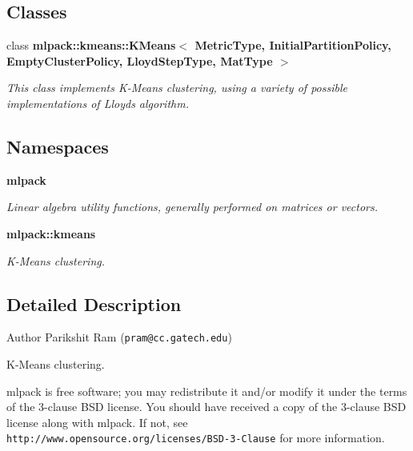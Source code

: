 \subsection*{Classes}
\begin{DoxyCompactItemize}
\item 
class {\bf mlpack\+::kmeans\+::\+K\+Means$<$ Metric\+Type, Initial\+Partition\+Policy, Empty\+Cluster\+Policy, Lloyd\+Step\+Type, Mat\+Type $>$}
\begin{DoxyCompactList}\small\item\em This class implements K-\/\+Means clustering, using a variety of possible implementations of Lloyd\textquotesingle{}s algorithm. \end{DoxyCompactList}\end{DoxyCompactItemize}
\subsection*{Namespaces}
\begin{DoxyCompactItemize}
\item 
 {\bf mlpack}
\begin{DoxyCompactList}\small\item\em Linear algebra utility functions, generally performed on matrices or vectors. \end{DoxyCompactList}\item 
 {\bf mlpack\+::kmeans}
\begin{DoxyCompactList}\small\item\em K-\/\+Means clustering. \end{DoxyCompactList}\end{DoxyCompactItemize}


\subsection{Detailed Description}
\begin{DoxyAuthor}{Author}
Parikshit Ram ({\tt pram@cc.\+gatech.\+edu})
\end{DoxyAuthor}
K-\/\+Means clustering.

mlpack is free software; you may redistribute it and/or modify it under the terms of the 3-\/clause B\+SD license. You should have received a copy of the 3-\/clause B\+SD license along with mlpack. If not, see {\tt http\+://www.\+opensource.\+org/licenses/\+B\+S\+D-\/3-\/\+Clause} for more information. 
